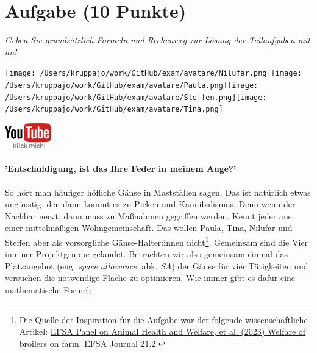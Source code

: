 \documentclass[a4paper, 9pt]{scrartcl}\usepackage[]{graphicx}\usepackage[]{xcolor}
\begin{document}

\clearpage

\section{Aufgabe \hfill (10 Punkte)}

\textit{Geben Sie grundsätzlich Formeln und Rechenweg zur Lösung der Teilaufgaben mit an!} \\[1Ex]
 

 
\begin{minipage}[t]{0.5\textwidth}
\texttt{[image: /Users/kruppajo/work/GitHub/exam/avatare/Nilufar.png]}\hspace{-4mm}\texttt{[image: /Users/kruppajo/work/GitHub/exam/avatare/Paula.png]}\hspace{-4mm}\texttt{[image: /Users/kruppajo/work/GitHub/exam/avatare/Steffen.png]}\hspace{-4mm}\texttt{[image: /Users/kruppajo/work/GitHub/exam/avatare/Tina.png]}
\end{minipage}
\begin{minipage}[t]{0.5\textwidth}
\hfill
\href{https://youtu.be/n451XnhtSh4}{\includegraphics[width = 2cm]{img/youtube}}
\end{minipage}




\paragraph{'Entschuldigung, ist das Ihre Feder in meinem Auge?'}



So hört man häufiger höfliche Gänse in Mastställen sagen. Das ist natürlich etwas ungünstig, den dann kommt es zu Picken und Kannibalismus. Denn wenn der Nachbar nervt, dann muss zu Maßnahmen gegriffen werden. Kennt jeder aus einer mittelmäßigen Wohngemeinschaft. Das wollen Paula, Tina, Nilufar und Steffen aber als vorsorgliche Gänse-Halter:innen nicht\footnote{Die Quelle der Inspiration für die Aufgabe war der folgende wissenschaftliche Artikel: \href{https://www.efsa.europa.eu/en/efsajournal/pub/7788}{EFSA Panel on Animal Health and Welfare, et al. (2023) Welfare of broilers on farm. EFSA Journal 21.2}.}. Gemeinsam sind die Vier in einer Projektgruppe gelandet. Betrachten wir also gemeinsam einmal das Platzangebot (eng. \textit{space allowance}, abk. \textit{SA}) der Gänse für vier Tätigkeiten und versuchen die notwendige Fläche zu optimieren. Wie immer gibt es dafür eine mathematische Formel:
\end{document}
